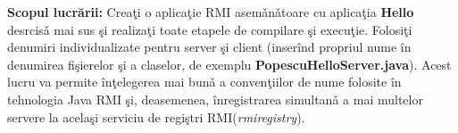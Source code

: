 \textbf{Scopul lucr\u{a}rii:} Crea\c{t}i o aplica\c{t}ie RMI asem\v{a}n\v{a}toare cu 
aplica\c{t}ia \textbf{Hello} desrcis\v{a} mai sus \c{s}i realiza\c{t}i toate etapele de 
compilare \c{s}i execu\c{t}ie. Folosi\c{t}i denumiri individualizate pentru server \c{s}i client (inser\^{i}nd propriul nume \^{i}n denumirea fi\c{s}ierelor \c{s}i a claselor, de exemplu
\textbf{PopescuHelloServer.java}). Acest lucru va permite \^{i}n\c{t}elegerea mai bun\v{a}
a conven\c{t}iilor de nume folosite \^{i}n tehnologia Java RMI \c{s}i, deasemenea, \^{i}nregistrarea
simultan\v{a} a mai multelor servere la acela\c{s}i serviciu de regi\c{s}tri RMI(\emph{rmiregistry}).
 
